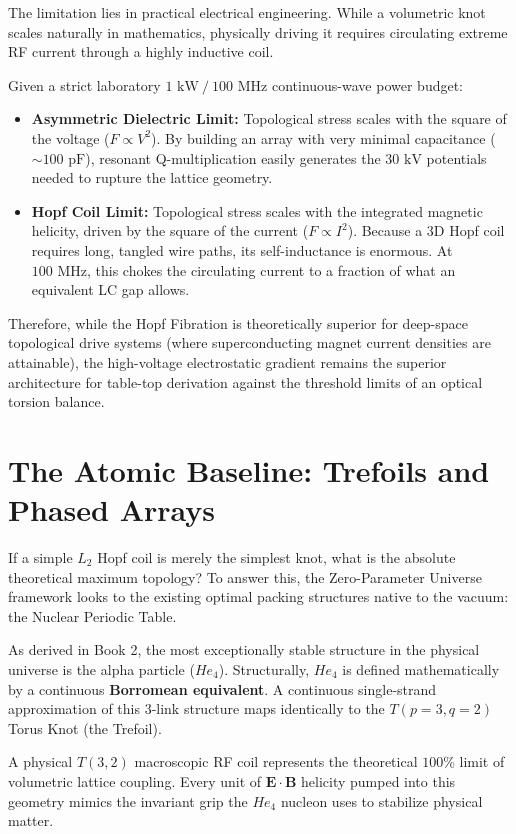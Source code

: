 The limitation lies in practical electrical engineering. While a volumetric knot scales naturally in mathematics, physically driving it requires circulating extreme RF current through a highly inductive coil.

Given a strict laboratory $1 \text{ kW} \ / \ 100 \text{ MHz}$ continuous-wave power budget:
\begin{itemize}
    \item \textbf{Asymmetric Dielectric Limit:} Topological stress scales with the square of the voltage ($F \propto V^2$). By building an array with very minimal capacitance ($\sim 100 \text{ pF}$), resonant Q-multiplication easily generates the $30 \text{ kV}$ potentials needed to rupture the lattice geometry.
    \item \textbf{Hopf Coil Limit:} Topological stress scales with the integrated magnetic helicity, driven by the square of the current ($F \propto I^2$). Because a 3D Hopf coil requires long, tangled wire paths, its self-inductance is enormous. At $100 \text{ MHz}$, this chokes the circulating current to a fraction of what an equivalent LC gap allows. 
\end{itemize}

Therefore, while the Hopf Fibration is theoretically superior for deep-space topological drive systems (where superconducting magnet current densities are attainable), the high-voltage electrostatic gradient remains the superior architecture for table-top derivation against the threshold limits of an optical torsion balance.

\section{The Atomic Baseline: Trefoils and Phased Arrays}

If a simple $L_2$ Hopf coil is merely the simplest knot, what is the absolute theoretical maximum topology? To answer this, the Zero-Parameter Universe framework looks to the existing optimal packing structures native to the vacuum: the Nuclear Periodic Table.

As derived in Book 2, the most exceptionally stable structure in the physical universe is the alpha particle ($He_4$). Structurally, $He_4$ is defined mathematically by a continuous \textbf{Borromean equivalent}. A continuous single-strand approximation of this $3$-link structure maps identically to the $T(p=3, q=2)$ Torus Knot (the Trefoil).

A physical $T(3,2)$ macroscopic RF coil represents the theoretical $100\%$ limit of volumetric lattice coupling. Every unit of $\mathbf{E} \cdot \mathbf{B}$ helicity pumped into this geometry mimics the invariant grip the $He_4$ nucleon uses to stabilize physical matter.


